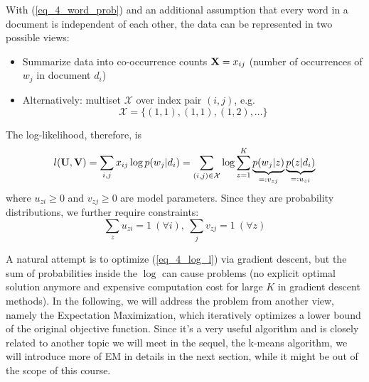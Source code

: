 \documentclass[../main.tex]{subfiles}
\begin{document}
\par With (\ref{eq_4_word_prob}) and an additional assumption that every word in a document is independent of each other, the data can be represented in two possible views:
\begin{itemize}
	\item Summarize data into co-occurrence counts ${\bf X}=x_{ij}$ (number of occurrences of $w_j$ in document $d_i$)
	\item Alternatively: multiset $\mathcal{X}$ over index pair $(i,j)$, e.g. 
	$$\mathcal{X} = \{(1,1), (1,1), (1, 2),\dots\}$$
\end{itemize} 
The log-likelihood, therefore, is
\begin{equation}\label{eq_4_log_l}
l({\bf U},{\bf V})=\sum_{i,j}x_{ij}\log p(w_j|d_i)=\sum_{(i,j)\in \mathcal{X}}\log \sum_{z=1}^{K} \underbrace{p(w_j|z)}_{=:v_{zj}}\underbrace{p(z|d_i)}_{=:u_{zi}}
\end{equation}
where $u_{zi}\geq 0$ and $v_{zj}\geq 0$ are model parameters. Since they are probability distributions, we further require constraints:
\begin{equation*}
\sum_z u_{zi}=1\ (\forall i),\ \sum_j v_{zj}=1\ (\forall z)
\end{equation*}
\par A natural attempt is to optimize (\ref{eq_4_log_l}) via gradient descent, but the sum of probabilities inside the $\log$ can cause problems (no explicit optimal solution anymore and expensive computation cost for large $K$ in gradient descent methods). In the following, we will address the problem from another view, namely the Expectation Maximization, which iteratively optimizes a lower bound of the original objective function. Since it's a very useful algorithm and is closely related to another topic we will meet in the sequel, the k-means algorithm, we will introduce more of EM in details in the next section, while it might be out of the scope of this course.
\end{document}
